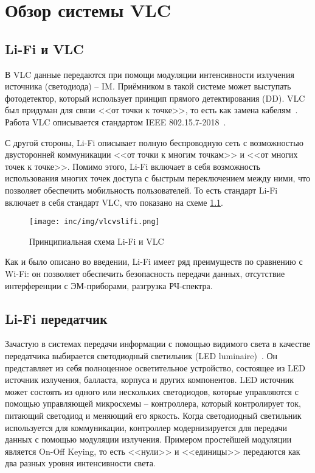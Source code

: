\chapter{Обзор системы VLC}

\section{Li-Fi и VLC}


В VLC данные передаются при помощи модуляции интенсивности излучения источника (светодиода) \--- IM. Приёмником в такой системе может выступать фотодетектор, который использует принцип прямого детектирования (DD). VLC был придуман для связи <<от точки к точке>>, то есть как замена кабелям~\cite{Haas16}. Работа VLC описывается стандартом IEEE 802.15.7-2018~\cite{IEEE2018}.

С другой стороны, Li-Fi описывает полную беспроводную сеть с возможностью двусторонней коммуникации <<от точки к многим точкам>> и  <<от многих точек к точке>>. Помимо этого, Li-Fi включает в себя возможность использования многих точек доступа с быстрым переключением между ними, что позволяет обеспечить мобильность пользователей. То есть стандарт Li-Fi включает в себя стандарт VLC, что показано на схеме \ref{fig:vlcvslifi}.

\begin{figure}[!ht]
    \centering
    \texttt{[image: inc/img/vlcvslifi.png]}
    \caption{Принципиальная схема Li-Fi и VLC~\cite{Haas16}}
    \label{fig:vlcvslifi}
\end{figure}

Как и было описано во введении, Li-Fi имеет ряд преимуществ по сравнению с Wi-Fi: он позволяет обеспечить безопасность передачи данных, отсутствие интерференции с ЭМ-приборами, разгрузка РЧ-спектра.

\section{Li-Fi передатчик}

Зачастую в системах передачи информации с помощью видимого света в качестве передатчика выбирается светодиодный светильник (LED luminaire)~\cite{LeMinh2008,Komine2006,Komine2004}. Он представляет из себя полноценное осветительное устройство, состоящее из LED источник излучения, балласта, корпуса и других компонентов. LED источник может состоять из одного или нескольких светодиодов, которые управляются с помощью управляющей микросхемы \--- контроллера, который контролирует ток, питающий светодиод и меняющий его яркость. Когда светодиодный светильник используется для коммуникации, контроллер модернизируется для передачи данных с помощью модуляции излучения. Примером простейшей модуляции является On-Off Keying, то есть <<нули>> и <<единицы>> передаются как два разных уровня интенсивности света.

